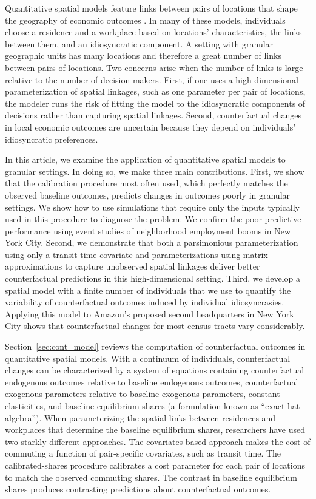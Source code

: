 \documentclass[11pt]{article}
\theoremstyle{definition}
\newcommand\idiosyncraticphrase{idiosyncratic preference}
\begin{document}
Quantitative spatial models feature links between pairs of locations that shape the geography of economic outcomes \citep{ReddingRossi-Hansberg:2017,ProostThisse:2019}.
In many of these models, individuals choose a residence and a workplace based on locations' characteristics, the links between them, and an idiosyncratic component.
A setting with granular geographic units has many locations and therefore a great number of links between pairs of locations.
Two concerns arise when the number of links is large relative to the number of decision makers.
First, if one uses a high-dimensional parameterization of spatial linkages,
such as one parameter per pair of locations,
the modeler runs the risk of fitting the model to the idiosyncratic components of decisions rather than capturing spatial linkages.
Second, 
counterfactual changes in local economic outcomes
are uncertain because they depend on individuals' \idiosyncraticphrase s.


In this article, we examine the application of quantitative spatial models to granular settings.
In doing so, we make three main contributions.
First, we show that
the calibration procedure most often used, which perfectly matches the observed baseline outcomes, predicts changes in outcomes poorly in granular settings.
We show how to use simulations
that require only the inputs typically used in this procedure
to diagnose the problem.
We confirm the poor predictive performance using event studies of neighborhood employment booms in New York City.
Second, we demonstrate that both
a parsimonious parameterization using only a transit-time covariate
and
parameterizations using matrix approximations to capture unobserved spatial linkages
deliver better counterfactual predictions in this high-dimensional setting.
Third,
we develop a spatial model with a finite number of individuals
that we use to quantify the variability of counterfactual outcomes induced by individual idiosyncrasies.
Applying this model to Amazon's proposed second headquarters in New York City shows that 
counterfactual changes for most census tracts vary considerably.

Section~\ref{sec:cont_model} reviews the computation of counterfactual outcomes in quantitative spatial models.
With a continuum of individuals, counterfactual changes can be characterized by a system of equations containing
counterfactual endogenous outcomes relative to baseline endogenous outcomes,
counterfactual exogenous parameters relative to baseline exogenous parameters,
constant elasticities,
and
baseline equilibrium shares
(a formulation known as ``exact hat algebra'').
When parameterizing the spatial links between residences and workplaces that determine the baseline equilibrium shares,
researchers have used two starkly different approaches.
The covariates-based approach
makes the cost of commuting a function of pair-specific covariates, such as transit time.
The calibrated-shares procedure
calibrates a cost parameter for each pair of locations to match the observed commuting shares.
The contrast in baseline equilibrium shares produces contrasting predictions about counterfactual outcomes.
\end{document}
